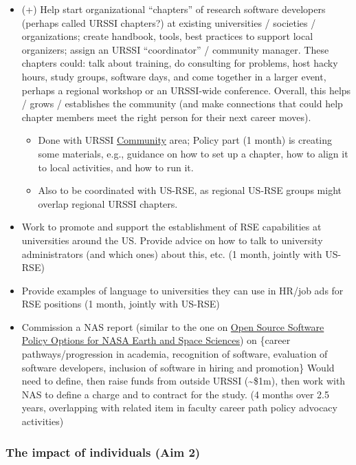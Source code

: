 \documentclass[
]{book}
\begin{document}
\begin{itemize}
\item
  (+) Help start organizational ``chapters'' of research software developers (perhaps called URSSI chapters?) at existing
  universities / societies / organizations; create handbook, tools, best practices to support
  local organizers; assign an URSSI ``coordinator'' / community manager. These chapters could:
  talk about training, do consulting for problems, host hacky hours, study groups, software days,
  and come together in a larger event, perhaps a regional workshop or an URSSI-wide conference. Overall, this
  helps / grows / establishes the community (and make connections that could help chapter members
  meet the right person for their next career moves).

  \begin{itemize}
  \item
    Done with URSSI \protect\hyperlink{Ch-Comm}{Community} area; Policy part (1 month) is creating some materials,
    e.g., guidance on how to set up a chapter, how to align it to local activities, and how to run it.
  \item
    Also to be coordinated with US-RSE, as regional US-RSE groups might overlap regional URSSI chapters.
  \end{itemize}
\item
  Work to promote and support the establishment of RSE capabilities at universities around the US.
  Provide advice on how to talk to university administrators (and which ones) about this, etc. (1 month,
  jointly with US-RSE)
\item
  Provide examples of language to universities they can use in HR/job ads for RSE positions
  (1 month, jointly with US-RSE)
\item
  Commission a NAS report (similar to the one on \href{https://www.nap.edu/read/25217/chapter/1}{Open Source Software Policy Options for NASA
  Earth and Space Sciences}) on
  \{career pathways/progression in academia, recognition of software, evaluation of software developers,
  inclusion of software in hiring and promotion\} Would need to define, then raise funds from
  outside URSSI (\textasciitilde\$1m), then work with NAS to define a charge and to contract for the study.
  (4 months over 2.5 years, overlapping with related item in faculty career path policy advocacy activities)
\end{itemize}

\hypertarget{the-impact-of-individuals-aim-2}{%
\subsubsection{The impact of individuals (Aim 2)}\label{the-impact-of-individuals-aim-2}}
\end{document}
